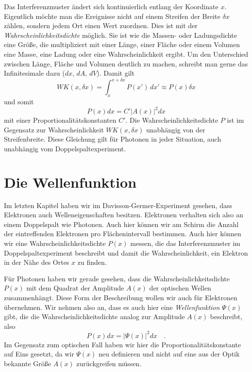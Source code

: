 Das Interferenzmuster ändert sich kontinuierlich entlang der Koordinate $x$. Eigentlich möchte man die Ereignisse nicht auf einem Streifen der Breite $\delta x$ zählen, sondern jedem Ort einen Wert zuordnen. Dies ist mit der \emph{Wahrscheinlichkeitsdichte} möglich. Sie ist wie die Massen- oder Ladungsdichte eine Größe, die multipliziert mit einer Länge, einer Fläche oder einem Volumen eine Masse, eine Ladung oder eine Wahrscheinlichkeit ergibt. Um den Unterschied zwischen Länge, Fläche und Volumen deutlich zu machen, schreibt man gerne das Infinitesimale dazu ($dx$, $dA$, $dV$). Damit gilt 
\begin{equation}
    WK(x, \delta x)  = \int_{x}^{x + \delta x} P(x') \, dx' \approx  P(x) \delta x 
\end{equation}
und somit
\begin{equation}
    P(x) dx  = C'  |A(x)|^2 dx
\end{equation}
mit einer Proportionalitätskonstanten $C'$.
Die Wahrscheinlichkeitsdichte $P$ ist im Gegensatz zur Wahrscheinlichkeit $WK(x, \delta x) $ unabhängig von der Streifenbreite. Diese Gleichung gilt für Photonen in jeder Situation, auch unabhängig vom  Doppelspaltexperiment.


\section{Die Wellenfunktion}

Im letzten Kapitel haben wir im Davisson-Germer-Experiment gesehen, dass Elektronen auch Welleneigenschaften besitzen. Elektronen verhalten sich also an einem Doppelspalt wie Photonen. Auch hier können wir am Schirm die Anzahl der eintreffenden Elektronen pro Flächenintervall bestimmen. Auch hier können wir eine Wahrscheinlichkeitsdichte $P(x)$ messen, die das Interferenzmuster im Doppelspaltexperiment beschreibt und damit die Wahrscheinlichkeit, ein Elektron in der Nähe des Ortes $x$ zu finden.

Für Photonen haben wir gerade gesehen, dass die Wahrscheinlichkeitsdichte $P(x)$ mit dem Quadrat der Amplitude $A(x)$ der optischen Wellen zusammenhängt. Diese Form der Beschreibung wollen wir auch für Elektronen übernehmen. Wir nehmen also an, dass es auch hier eine \emph{Wellenfunktion} $\Psi(x)$ gibt, die die Wahrscheinlichkeitsdichte analog zur Amplitude $A(x)$ beschreibt, also
\begin{equation}
    P(x) dx  = |\Psi(x)|^2 dx \quad .
\end{equation}
Im Gegensatz zum optischen Fall haben wir hier die Proportionalitätskonstante auf Eins gesetzt, da wir $\Psi(x)$ neu definieren und nicht auf eine aus der Optik bekannte Größe $A(x)$ zurückgreifen müssen.

